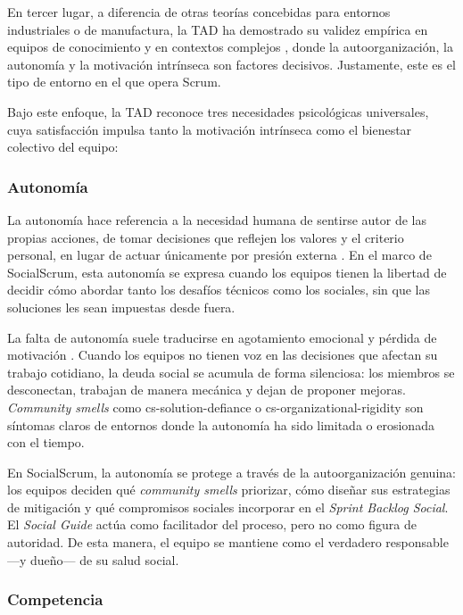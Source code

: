 En tercer lugar, a diferencia de otras teorías concebidas para entornos industriales o de manufactura, la TAD ha demostrado su validez empírica en equipos de conocimiento y en contextos complejos \cite{ryan_self-determination_2000}, donde la autoorganización, la autonomía y la motivación intrínseca son factores decisivos. Justamente, este es el tipo de entorno en el que opera Scrum.

Bajo este enfoque, la TAD reconoce tres necesidades psicológicas universales, cuya satisfacción impulsa tanto la motivación intrínseca como el bienestar colectivo del equipo:

\subsubsection{Autonomía}

La autonomía hace referencia a la necesidad humana de sentirse autor de las propias acciones, de tomar decisiones que reflejen los valores y el criterio personal, en lugar de actuar únicamente por presión externa \cite{ryan_self-determination_2000}.
En el marco de SocialScrum, esta autonomía se expresa cuando los equipos tienen la libertad de decidir cómo abordar tanto los desafíos técnicos como los sociales, sin que las soluciones les sean impuestas desde fuera.

La falta de autonomía suele traducirse en agotamiento emocional y pérdida de motivación \cite{tulili2022burnout}.
Cuando los equipos no tienen voz en las decisiones que afectan su trabajo cotidiano, la deuda social se acumula de forma silenciosa: los miembros se desconectan, trabajan de manera mecánica y dejan de proponer mejoras.
\textit{Community smells} como \gls{cs-solution-defiance} o \gls{cs-organizational-rigidity} son síntomas claros de entornos donde la autonomía ha sido limitada o erosionada con el tiempo.

En SocialScrum, la autonomía se protege a través de la autoorganización genuina: los equipos deciden qué \textit{community smells} priorizar, cómo diseñar sus estrategias de mitigación y qué compromisos sociales incorporar en el \textit{Sprint Backlog Social}.
El \textit{Social Guide} actúa como facilitador del proceso, pero no como figura de autoridad. De esta manera, el equipo se mantiene como el verdadero responsable —y dueño— de su salud social.

\subsubsection{Competencia}


